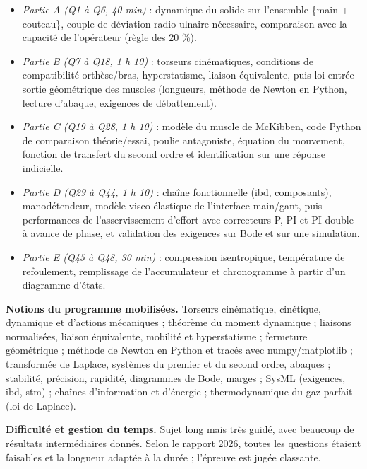 \documentclass[11pt,a4paper]{article}
\providecommand{\tightlist}{\setlength{\itemsep}{0pt}\setlength{\parskip}{0pt}}
\begin{document}
\begin{itemize}
\tightlist
\item
  \emph{Partie A (Q1 à Q6, 40 min)} : dynamique du solide sur l'ensemble \{main + couteau\}, couple de déviation radio-ulnaire nécessaire, comparaison avec la capacité de l'opérateur (règle des 20 \%).
\item
  \emph{Partie B (Q7 à Q18, 1 h 10)} : torseurs cinématiques, conditions de compatibilité orthèse/bras, hyperstatisme, liaison équivalente, puis loi entrée-sortie géométrique des muscles (longueurs, méthode de Newton en Python, lecture d'abaque, exigences de débattement).
\item
  \emph{Partie C (Q19 à Q28, 1 h 10)} : modèle du muscle de McKibben, code Python de comparaison théorie/essai, poulie antagoniste, équation du mouvement, fonction de transfert du second ordre et identification sur une réponse indicielle.
\item
  \emph{Partie D (Q29 à Q44, 1 h 10)} : chaîne fonctionnelle (ibd, composants), manodétendeur, modèle visco-élastique de l'interface main/gant, puis performances de l'asservissement d'effort avec correcteurs P, PI et PI double à avance de phase, et validation des exigences sur Bode et sur une simulation.
\item
  \emph{Partie E (Q45 à Q48, 30 min)} : compression isentropique, température de refoulement, remplissage de l'accumulateur et chronogramme à partir d'un diagramme d'états.
\end{itemize}

\textbf{Notions du programme mobilisées.} Torseurs cinématique, cinétique, dynamique et d'actions mécaniques ; théorème du moment dynamique ; liaisons normalisées, liaison équivalente, mobilité et hyperstatisme ; fermeture géométrique ; méthode de Newton en Python et tracés avec numpy/matplotlib ; transformée de Laplace, systèmes du premier et du second ordre, abaques ; stabilité, précision, rapidité, diagrammes de Bode, marges ; SysML (exigences, ibd, stm) ; chaînes d'information et d'énergie ; thermodynamique du gaz parfait (loi de Laplace).

\textbf{Difficulté et gestion du temps.} Sujet long mais très guidé, avec beaucoup de résultats intermédiaires donnés. Selon le rapport 2026, toutes les questions étaient faisables et la longueur adaptée à la durée ; l'épreuve est jugée classante.
\end{document}
